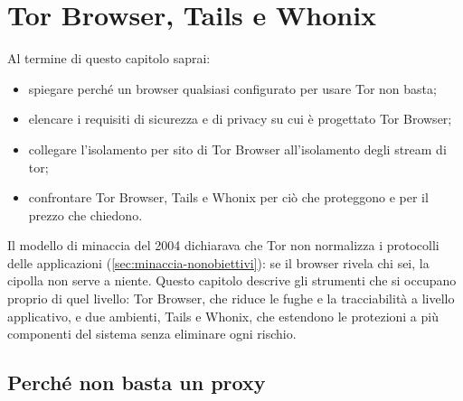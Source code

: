 \chapter{Tor Browser, Tails e Whonix}\label{cap:23-browser}

\begin{obiettivi}
Al termine di questo capitolo saprai:
\begin{itemize}[nosep]
  \item spiegare perché un browser qualsiasi configurato per usare Tor non basta;
  \item elencare i requisiti di sicurezza e di privacy su cui è progettato Tor Browser;
  \item collegare l'isolamento per sito di Tor Browser all'isolamento degli stream di tor;
  \item confrontare Tor Browser, Tails e Whonix per ciò che proteggono e per il prezzo che chiedono.
\end{itemize}
\end{obiettivi}

Il modello di minaccia del 2004 dichiarava che Tor non normalizza i protocolli delle applicazioni (\cref{sec:minaccia-nonobiettivi}): se il browser rivela chi sei, la cipolla non serve a niente. Questo capitolo descrive gli strumenti che si occupano proprio di quel livello: Tor Browser, che riduce le fughe e la tracciabilità a livello applicativo, e due ambienti, Tails e Whonix, che estendono le protezioni a più componenti del sistema senza eliminare ogni rischio.

\section{Perché non basta un proxy}\label{sec:browser-proxy}

